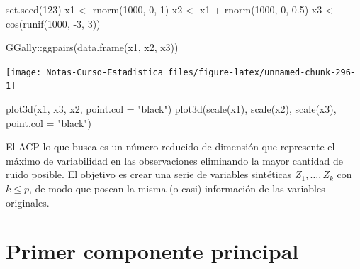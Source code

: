 \documentclass[
  12pt,
]{book}
\newenvironment{Shaded}{\begin{snugshade}}{\end{snugshade}}
\newcommand{\AttributeTok}[1]{\textcolor[rgb]{0.77,0.63,0.00}{#1}}
\newcommand{\DecValTok}[1]{\textcolor[rgb]{0.00,0.00,0.81}{#1}}
\newcommand{\FloatTok}[1]{\textcolor[rgb]{0.00,0.00,0.81}{#1}}
\newcommand{\FunctionTok}[1]{\textcolor[rgb]{0.00,0.00,0.00}{#1}}
\newcommand{\NormalTok}[1]{#1}
\newcommand{\OtherTok}[1]{\textcolor[rgb]{0.56,0.35,0.01}{#1}}
\newcommand{\SpecialCharTok}[1]{\textcolor[rgb]{0.00,0.00,0.00}{#1}}
\newcommand{\StringTok}[1]{\textcolor[rgb]{0.31,0.60,0.02}{#1}}
\theoremstyle{definition}
\theoremstyle{definition}
\theoremstyle{definition}
\theoremstyle{definition}
\theoremstyle{remark}
\begin{document}
\begin{Shaded}
\begin{Highlighting}[]
\FunctionTok{set.seed}\NormalTok{(}\DecValTok{123}\NormalTok{)}
\NormalTok{x1 }\OtherTok{\textless{}{-}} \FunctionTok{rnorm}\NormalTok{(}\DecValTok{1000}\NormalTok{, }\DecValTok{0}\NormalTok{, }\DecValTok{1}\NormalTok{)}
\NormalTok{x2 }\OtherTok{\textless{}{-}}\NormalTok{ x1 }\SpecialCharTok{+} \FunctionTok{rnorm}\NormalTok{(}\DecValTok{1000}\NormalTok{, }\DecValTok{0}\NormalTok{, }\FloatTok{0.5}\NormalTok{)}
\NormalTok{x3 }\OtherTok{\textless{}{-}} \FunctionTok{cos}\NormalTok{(}\FunctionTok{runif}\NormalTok{(}\DecValTok{1000}\NormalTok{, }\SpecialCharTok{{-}}\DecValTok{3}\NormalTok{, }\DecValTok{3}\NormalTok{))}
\end{Highlighting}
\end{Shaded}

\begin{Shaded}
\begin{Highlighting}[]
\NormalTok{GGally}\SpecialCharTok{::}\FunctionTok{ggpairs}\NormalTok{(}\FunctionTok{data.frame}\NormalTok{(x1, x2, x3))}
\end{Highlighting}
\end{Shaded}

\begin{center}\texttt{[image: Notas-Curso-Estadistica\_files/figure-latex/unnamed-chunk-296-1]} \end{center}

\begin{Shaded}
\begin{Highlighting}[]
\FunctionTok{plot3d}\NormalTok{(x1, x3, x2, }\AttributeTok{point.col =} \StringTok{"black"}\NormalTok{)}
\FunctionTok{plot3d}\NormalTok{(}\FunctionTok{scale}\NormalTok{(x1), }\FunctionTok{scale}\NormalTok{(x2), }\FunctionTok{scale}\NormalTok{(x3), }\AttributeTok{point.col =} \StringTok{"black"}\NormalTok{)}
\end{Highlighting}
\end{Shaded}

El ACP lo que busca es un número reducido de dimensión que represente el máximo de variabilidad en las observaciones eliminando la mayor cantidad de ruido posible. El objetivo es crear una serie de variables sintéticas \(Z_{1},\dots, Z_{k}\) con \(k\leq p\), de modo que posean la misma (o casi) información de las variables originales.

\hypertarget{primer-componente-principal}{%
\section{Primer componente principal}\label{primer-componente-principal}}
\end{document}
